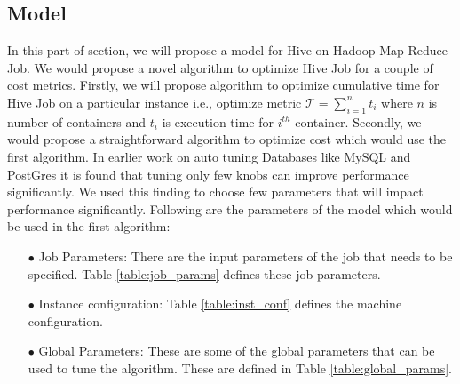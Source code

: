 \subsection{Model}

In this part of section, we will propose a model for Hive on Hadoop Map Reduce Job. We would propose a novel algorithm to optimize Hive Job for a couple of cost metrics. Firstly, we will propose algorithm to optimize cumulative time for Hive Job on a particular instance i.e., optimize metric $\mathcal{T} = \sum_{i=1}^{n} t_i$ where $n$ is number of containers and $t_i$ is execution time for $i^{th}$ container. Secondly, we would propose a straightforward algorithm to optimize cost which would use the first algorithm. In earlier work \cite{VanKen} on auto tuning Databases like MySQL and PostGres it is found that tuning only few knobs can improve performance significantly. We used this finding to choose few parameters that will impact performance significantly.
Following are the parameters of the model which would be used in the first algorithm:
\begin{enumerate}
    \item[$\bullet$] Job Parameters: There are the input parameters of the job that needs to be specified. Table \ref{table:job_params} defines these job parameters.
    \item[$\bullet$] Instance configuration: Table \ref{table:inst_conf} defines the machine configuration.
    \item[$\bullet$] Global Parameters: These are some of the global parameters that can be used to tune the algorithm. These are defined in Table \ref{table:global_params}.
\end{enumerate}


